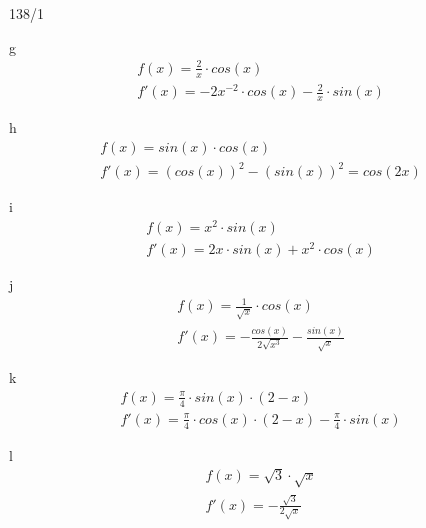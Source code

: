 \begin{exercise}{138/1}
  \item [g]
  \begin{gather*}
    f(x) = \frac{2}{x} \cdot cos(x) \\
    f'(x) = -2x^{-2} \cdot cos(x) - \frac{2}{x} \cdot sin(x)
  \end{gather*}
  \item [h]
  \begin{gather*}
    f(x) = sin(x) \cdot cos(x) \\
    f'(x) = (cos(x))^2 - (sin(x))^2 = cos(2x)
  \end{gather*}
  \item [i]
  \begin{gather*}
    f(x) = x^2 \cdot sin(x) \\
    f'(x) = 2x \cdot sin(x) + x^2 \cdot cos(x)
  \end{gather*}
  \item [j]
  \begin{gather*}
    f(x) = \frac{1}{\sqrt{x}} \cdot cos(x) \\
    f'(x) = -\frac{cos(x)}{2\sqrt{x^3}} - \frac{sin(x)}{\sqrt{x}}
  \end{gather*}
  \item [k]
  \begin{gather*}
    f(x) = \frac{\pi}{4} \cdot sin(x) \cdot (2 - x) \\
    f'(x) = \frac{\pi}{4} \cdot cos(x) \cdot (2 - x) - \frac{\pi}{4} \cdot sin(x)
  \end{gather*}
  \item [l]
  \begin{gather*}
    f(x) = \sqrt{3} \cdot \sqrt{x} \\
    f'(x) = -\frac{\sqrt{3}}{2\sqrt{x}}
  \end{gather*}
\end{exercise}


